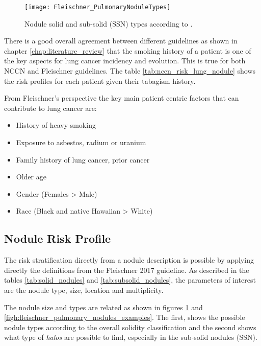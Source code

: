 \begin{center}
\begin{figure}
\begin{centering}
\texttt{[image: Fleischner\_PulmonaryNoduleTypes]}
\par\end{centering}
\caption{\label{figh:fleischner_pulmonary_nodules_types}Nodule solid and sub-solid (SSN) types according to .}
\end{figure}
\vspace*{-38pt}
\end{center}

There is a good overall agreement between different guidelines as shown in chapter \ref{chap:literature_review} that the smoking history of a patient is one of the key aspects for lung cancer incidency and evolution. This is true for both NCCN and Fleischner guidelines. The table \ref{tab:nccn_risk_lung_nodule} shows the risk profiles for each patient given their tabagism history. 

From Fleischner's perspective the key main patient centric factors that can contribute to lung cancer are:

\begin{itemize}
  \item History of heavy smoking
  \item Exposure to asbestos, radium or uranium
  \item Family history of lung cancer, prior cancer
  \item Older age
  \item Gender (Females > Male)
  \item Race (Black and native Hawaiian > White)
\end{itemize}

\subsection{Nodule Risk Profile}

The risk stratification directly from a nodule description is possible by applying directly the definitions from the Fleischner 2017 guideline. As described in the tables \ref{tab:solid_nodules} and \ref{tab:subsolid_nodules}, the parameters of interest are the nodule type, size, location and multiplicity. 

The nodule size and types are related as shown in figures \ref{figh:fleischner_pulmonary_nodules_types} and \ref{figh:fleischner_pulmonary_nodules_examples}. The first, shows the possible nodule types according to the overall solidity classification and the second shows what type of \emph{halos} are possible to find, especially in the sub-solid nodules (SSN).

